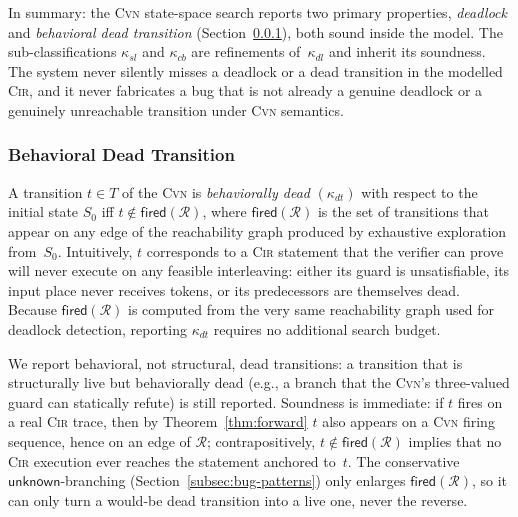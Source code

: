 \begin{remark}
\label{rem:soundness-scope}
In summary: the \textsc{Cvn} state-space search reports two primary
properties, \emph{deadlock} and \emph{behavioral dead transition}
(Section~\ref{subsubsec:dead-transition}), both sound inside the model.
The sub-classifications $\kappa_{sl}$ and $\kappa_{cb}$ are refinements
of~$\kappa_{dl}$ and inherit its soundness. The system never silently
misses a deadlock or a dead transition in the modelled \textsc{Cir},
and it never fabricates a bug that is not already a genuine deadlock
or a genuinely unreachable transition under \textsc{Cvn} semantics.
\end{remark}

\subsubsection{Behavioral Dead Transition}
\label{subsubsec:dead-transition}

A transition $t\in T$ of the \textsc{Cvn} is \emph{behaviorally dead}
$(\kappa_{dt})$ with respect to the initial state $S_0$ iff
$t\notin \mathsf{fired}(\mathcal{R})$, where $\mathsf{fired}(\mathcal{R})$ is
the set of transitions that appear on any edge of the reachability
graph produced by exhaustive exploration from~$S_0$. Intuitively, $t$
corresponds to a \textsc{Cir} statement that the verifier can prove
will never execute on any feasible interleaving: either its guard is
unsatisfiable, its input place never receives tokens, or its
predecessors are themselves dead. Because $\mathsf{fired}(\mathcal{R})$ is
computed from the very same reachability graph used for deadlock
detection, reporting $\kappa_{dt}$ requires no additional search
budget.

We report behavioral, not structural, dead transitions: a transition
that is structurally live but behaviorally dead (e.g., a branch that
the \textsc{Cvn}'s three-valued guard can statically refute) is still
reported. Soundness is immediate: if $t$ fires on a real \textsc{Cir}
trace, then by Theorem~\ref{thm:forward} $t$ also appears on a
\textsc{Cvn} firing sequence, hence on an edge of $\mathcal{R}$;
contrapositively, $t\notin\mathsf{fired}(\mathcal{R})$ implies that no
\textsc{Cir} execution ever reaches the statement anchored to~$t$.
The conservative $\mathsf{unknown}$-branching (Section~\ref{subsec:bug-patterns})
only enlarges $\mathsf{fired}(\mathcal{R})$, so it can only turn a would-be
dead transition into a live one, never the reverse.


